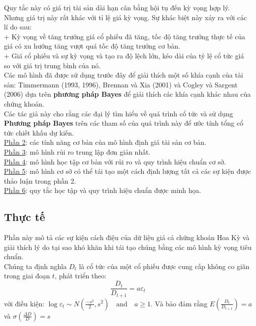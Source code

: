 \documentclass[10pt,a4paper]{article}
\begin{document}
	Quy tắc này có giá trị tài sản dài hạn cân bằng hội tụ đến kỳ vọng hợp lý. Nhưng giá trị này rất khác với tỉ lệ giá kỳ vọng. Sự khác biệt này xảy ra với các lí do sau:\\
	+ Kỳ vọng về tăng trưởng giá cổ phiếu đã tăng, tốc độ tăng trưởng thực tế của giá
	có xu hướng tăng vượt quá tốc độ tăng trưởng cơ bản.\\
	+ Giá cổ phiếu và sự kỳ vọng và tạo ra độ lệch lớn, kéo dài của tỷ lệ cổ tức giá so với giá trị trung bình của nó.\\
	Các mô hình đã được sử dụng trước đây để giải thích một số khía cạnh của tài sản: Timmermann (1993, 1996), Brennan và Xia (2001) và Cogley
	và Sargent (2006)  dựa trên \textbf{phương pháp Bayes} để giải thích các khía cạnh khác nhau của chứng khoán.\\
	
	Các tác giả này cho rằng các đại lý tìm hiểu về quá trình cổ tức và
	sử dụng \textbf{Phương pháp Bayes} trên các tham số của quá trình này để ước tính
	tổng cổ tức chiết khấu dự kiến.\\
	\underline{ Phần 2}: các tính năng cơ bản của mô hình định giá tài sản cơ bản.\\
	\underline{ Phần 3}: mô hình rủi ro trung lập đơn giản nhất.\\
	\underline{ Phần 4}: mô hình học tập cơ bản với rủi ro và quy trình hiệu chuẩn cơ sở.\\
	\underline{ Phần 5}: mô hình cơ sở có thể tái tạo một cách định lượng tất cả các sự kiện được thảo luận trong phần 2.\\
	\underline{ Phần 6}: quy tắc học tập và quy trình hiệu chuẩn được minh họa.
	\subsection{Thực tế}
		\begin{figure}[!h]
		\centering
	\end{figure}
	Phần này mô tả các sự kiện cách điệu của dữ liệu giá cả chứng khoán Hoa Kỳ và giải thích lý do tại sao khó khăn khi tái tạo chúng bằng các mô hình kỳ vọng tiêu chuẩn.\\
	Chúng ta định nghĩa $D_t$ là cổ tức của một cổ phiếu được cung cấp không co giãn trong giai đoạn $t$, phát triển theo:
	\begin{equation}
	\frac{D_t}{D_{t+1}}=a\varepsilon_t
	\end{equation}
	với điều kiện: $\log \varepsilon_t \sim N(\frac{-s^2}{2},s^2) \quad \text {and}  \quad a \geq 1.$ Và bảo đảm rằng $E\left(\frac{D_t}{D_{t+1}}\right)=a$ và $\sigma\left(\frac{\Delta D}{D}\right)=s$\\
	
\end{document}

